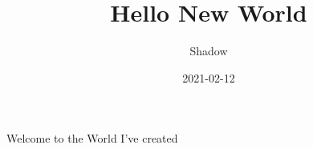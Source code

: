 \documentclass{article}
\title{Hello New World}
\date{2021-02-12}
\author{Shadow}
\begin{document}
	\maketitle
	\newpage
	Welcome to the World I've created
\end{document}
